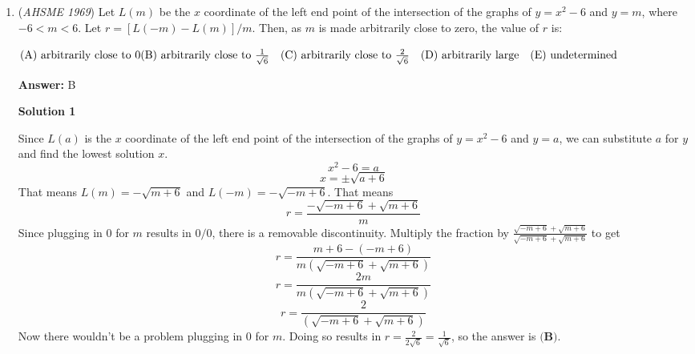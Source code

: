 \begin{enumerate}
 

$\text{(A) }2^{100}-1 \quad \text{(B) } 2^{100}(x-1)-(x-2)\quad \text{(C) } 2^{200}(x-3)\quad\\ \text{(D) } x(2^{100}-1)+2(2^{99}-1)\quad \text{(E) } 2^{100}(x+1)-(x+2)$

 \textbf{Answer: }B



\textbf{Solution}

Let the polynomial $Q(x)$ be the quotient when $x^{100}$ is divided by $x^2-3x+2$, and let the remainder $R=ax+b$, for some real $a$ and $b$. Then we can write: $x^{100}=(x^2-3x+2)Q(x)+ax+b$. Since it is hard to deal with $Q(x)$ (it is of degree 98!), we factor $x^2-3x+2$ as $(x-2)(x-1)$ so we can eliminate $Q(x)$ by plugging in $x$ values of $2$ and $1$.

 
$x^{100}=(x-2)(x-1)Q(x)+ax+b$,

 $2^{100}=(0)Q(2)+2a+b$,

 $2^{100}=2a+b$.

 Similarly, $1^{100}=a+b$.

 
Solving this system of equations gives $a=2^{100}-1$ and $b=2-2^{100}$. Thus, $R=ax+b=(2^{100}-1)x+(2-2^{100})$. Expanding and combining terms, we see that the answer is $\fbox{B}$.

 


	\item (\textit{AHSME 1969}) Let $L(m)$ be the $x$ coordinate of the left end point of the intersection of the graphs of $y=x^2-6$ and $y=m$, where $-6<m<6$. Let $r=[L(-m)-L(m)]/m$. Then, as $m$ is made arbitrarily close to zero, the value of $r$ is:


 $\text{(A) arbitrarily close to } 0\quad\\ \text{(B) arbitrarily close to }\frac{1}{\sqrt{6}}\quad \text{(C) arbitrarily close to }\frac{2}{\sqrt{6}} \quad \text{(D) arbitrarily large} \quad \text{(E) undetermined}$

 \textbf{Answer: }B



\textbf{Solution 1}

Since $L(a)$ is the $x$ coordinate of the left end point of the intersection of the graphs of $y=x^2-6$ and $y=a$, we can substitute $a$ for $y$ and find the lowest solution $x$.
 \[x^2 - 6 = a\]
 \[x = \pm \sqrt{a+6}\]That means $L(m) = -\sqrt{m+6}$ and $L(-m) = -\sqrt{-m+6}$.  That means
 \[r = \frac{-\sqrt{-m+6}+\sqrt{m+6}}{m}\]Since plugging in $0$ for $m$ results in $0/0$, there is a removable discontinuity.  Multiply the fraction by $\frac{\sqrt{-m+6}+\sqrt{m+6}}{\sqrt{-m+6}+\sqrt{m+6}}$ to get
 \[r = \frac{m+6 - (-m+6)}{m(\sqrt{-m+6}+\sqrt{m+6})}\]
 \[r = \frac{2m}{m(\sqrt{-m+6}+\sqrt{m+6})}\]
 \[r = \frac{2}{(\sqrt{-m+6}+\sqrt{m+6})}\]Now there wouldn't be a problem plugging in $0$ for $m$.  Doing so results in $r = \frac{2}{2\sqrt{6}} = \frac{1}{\sqrt{6}}$, so the answer is $\boxed{\textbf{(B)}}$.


\end{enumerate}
